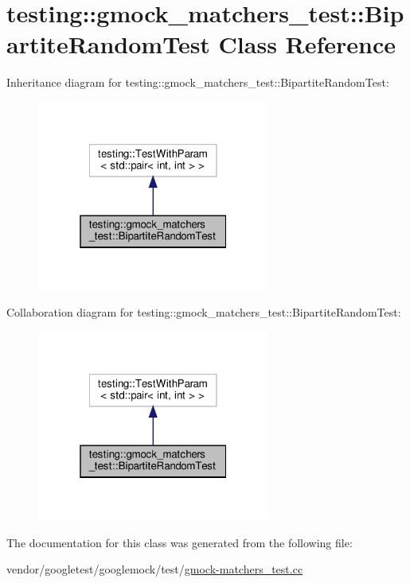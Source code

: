 \hypertarget{classtesting_1_1gmock__matchers__test_1_1_bipartite_random_test}{}\section{testing\+:\+:gmock\+\_\+matchers\+\_\+test\+:\+:Bipartite\+Random\+Test Class Reference}
\label{classtesting_1_1gmock__matchers__test_1_1_bipartite_random_test}


Inheritance diagram for testing\+:\+:gmock\+\_\+matchers\+\_\+test\+:\+:Bipartite\+Random\+Test\+:
\nopagebreak
\begin{figure}[H]
\begin{center}
\leavevmode
\includegraphics[width=217pt]{classtesting_1_1gmock__matchers__test_1_1_bipartite_random_test__inherit__graph}
\end{center}
\end{figure}


Collaboration diagram for testing\+:\+:gmock\+\_\+matchers\+\_\+test\+:\+:Bipartite\+Random\+Test\+:
\nopagebreak
\begin{figure}[H]
\begin{center}
\leavevmode
\includegraphics[width=217pt]{classtesting_1_1gmock__matchers__test_1_1_bipartite_random_test__coll__graph}
\end{center}
\end{figure}


The documentation for this class was generated from the following file\+:\begin{DoxyCompactItemize}
\item 
vendor/googletest/googlemock/test/\hyperlink{gmock-matchers__test_8cc}{gmock-\/matchers\+\_\+test.\+cc}\end{DoxyCompactItemize}
